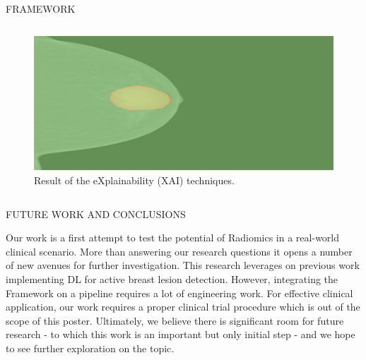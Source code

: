 \documentclass[final]{beamer}
\begin{document}
\begin{frame}[t, fragile = singleslide]{}
\begin{columns}[t]
\begin{column}{0.945\textwidth}
\begin{block}{FRAMEWORK}
\begin{column}[T]{0.33\textwidth}
\begin{figure}[!htb]
\centering
\caption{Result of the eXplainability (XAI) techniques.}
\label{fig:fig004}
\includegraphics[width = 0.75\columnwidth]{./figures/fig004}
\end{figure}
\end{column}

\end{block}

\end{column}

\end{columns}

\hfill

\begin{columns}[t]

\begin{column}{0.45\textwidth}

\begin{block}{FUTURE WORK AND CONCLUSIONS}

Our work is a first attempt to test the potential of Radiomics in a real-world clinical scenario.
More than answering our research questions it opens a number of new avenues for further investigation.
This research leverages on previous work implementing DL for active breast lesion detection.
However, integrating the Framework on a pipeline requires a lot of engineering work.
For effective clinical application, our work requires a proper clinical trial procedure which is out of the scope of this poster.
Ultimately, we believe there is significant room for future research - to which this work is an important but only initial step - and we hope to see further exploration on the topic.

\end{block}


\end{column}
\end{columns}
\end{frame}
\end{document}

